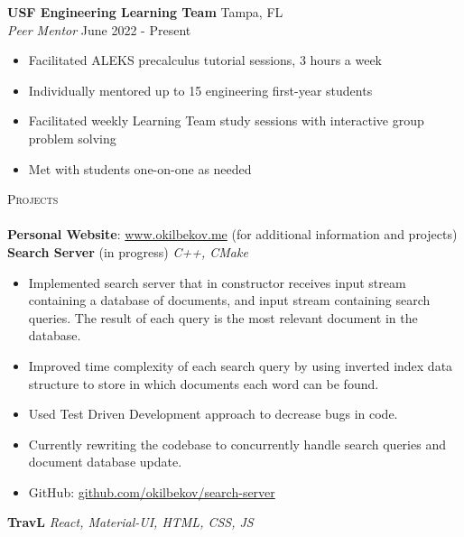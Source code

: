 \documentclass[a4paper]{article}
\newcommand{\lineunder} {
    \vspace*{-8pt} \\
    \hspace*{-18pt} \hrulefill \\
}
\newcommand{\header} [1] {
    {\hspace*{-18pt}\vspace*{6pt} \textsc{#1}}
    \vspace*{-6pt} \lineunder
}
\begin{document}
\textbf{USF Engineering Learning Team} \hfill Tampa, FL\\
\textit{Peer Mentor} \hfill June 2022 - Present\\
\vspace{-2mm}
\begin{itemize} \itemsep 1pt
	\item Facilitated ALEKS precalculus tutorial sessions, 3 hours a week
	\vspace{-2mm}
	\item Individually mentored up to 15 engineering first-year students
	\vspace{-2mm}
	\item Facilitated weekly Learning Team study sessions with interactive group problem solving
	\vspace{-2mm}
	\item Met with students one-on-one as needed
\end{itemize}
{\Large \header{Projects}}
{\textbf{Personal Website}}: \href{www.okilbekov.me}{www.okilbekov.me} (for additional information and projects) \\
{\textbf{Search Server}} (in progress) {\sl C++, CMake} \\
\vspace{-2mm}
\begin{itemize} \itemsep 1pt
	\item Implemented search server that in constructor receives input stream containing a database of documents, and input stream containing search queries. The result of each query is the most relevant document in the database.
	\vspace{-2mm}
	\item Improved time complexity of each search query by using inverted index data structure to store in which documents each word can be found.
	\vspace{-2mm}
	\item  Used Test Driven Development approach to decrease bugs in code.
	\vspace{-2mm}
	\item Currently rewriting the codebase to concurrently handle search queries and document database update.
	\vspace{-2mm}
	\item GitHub: \href{https://github.com/okilbekov/search-server}{github.com/okilbekov/search-server}
\end{itemize}
{\textbf{TravL}} {\sl React, Material-UI, HTML, CSS, JS}\\
\end{document}
